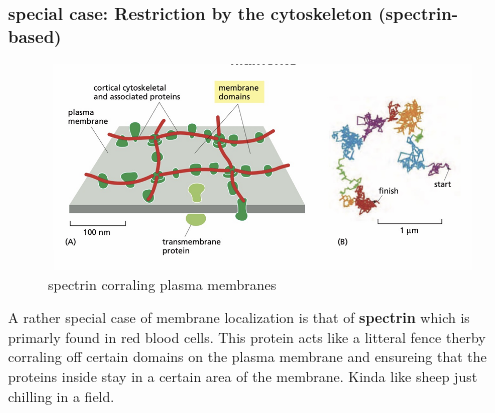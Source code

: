 \documentclass[../main.tex]{subfiles}
\begin{document}
\subsubsection{special case: Restriction by the cytoskeleton (spectrin- based)}

\begin{figure}[H]
    \centering
    \includegraphics[width=\linewidth]{spectrin.png}
    \caption{\gls{spectrin} corraling plasma membranes}
    \label{fig:enter-label}
\end{figure}

A rather special case of membrane localization is that of\textbf{ spectrin} which is primarly found in red blood cells. This protein acts like a litteral fence therby corraling off certain domains on the plasma membrane and ensureing that the proteins inside stay in a certain area of the membrane. Kinda like sheep just chilling in a field.
\end{document}
